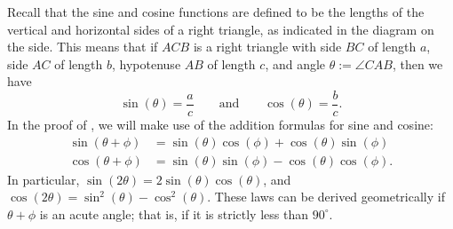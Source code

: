 \begin{figure}[H]
  \centering
\end{figure}

Recall that the sine and cosine functions are defined to be the lengths of the vertical and horizontal sides of a right triangle, as indicated in the diagram on the side. This means that if $ACB$ is a right triangle with side $BC$ of length $a$, side $AC$ of length $b$, hypotenuse $AB$ of length $c$, and angle $\theta:=\angle CAB$, then we have
\begin{equation*}
  \sin(\theta) = \frac{a}{c}\qquad\text{and}\qquad \cos(\theta)=\frac{b}{c}.
\end{equation*}
In the proof of , we will make use of the addition formulas for sine and cosine:
\begin{align*}
  \sin(\theta + \phi) & = \sin(\theta)\cos(\phi) + \cos(\theta)\sin(\phi) \\
  \cos(\theta + \phi) & = \sin(\theta)\sin(\phi) - \cos(\theta)\cos(\phi).
\end{align*}
In particular, $\sin(2\theta)=2\sin(\theta)\cos(\theta)$, and $\cos(2\theta)=\sin^2(\theta)-\cos^2(\theta)$. These laws can be derived geometrically if $\theta+\phi$ is an acute angle; that is, if it is strictly less than $90^\circ$.

